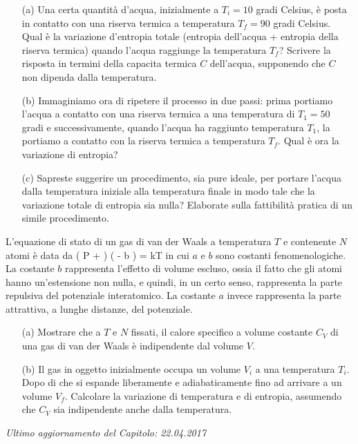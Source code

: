 
\begin{Exercise}[title={Cara, butta giù la pasta che sto arrivando!}, label={ex:01-pasta}]
\begin{itemize}
\item[(a)]
Una certa quantità d'acqua, inizialmente a $T_i = 10$ gradi Celsius, è posta in contatto con una riserva termica a temperatura $T_f = 90$ gradi Celsius. Qual è la variazione d'entropia totale (entropia dell'acqua + entropia della riserva termica) quando l'acqua raggiunge la temperatura $T_f$? Scrivere la risposta in termini della capacita termica $C$ dell'acqua, supponendo che $C$ non dipenda dalla temperatura.
\item[(b)]
Immaginiamo ora di ripetere il processo in due passi: prima portiamo l'acqua a contatto con una riserva termica a una temperatura di $T_1 = 50$ gradi e successivamente, quando l'acqua ha raggiunto temperatura $T_1$, la portiamo a contatto con la riserva termica a temperatura $T_f$. Qual è ora la variazione di entropia?
\item[(c)]
Sapreste suggerire un procedimento, sia pure ideale, per portare l'acqua dalla temperatura iniziale alla temperatura finale in modo tale che la variazione totale di entropia sia nulla? Elaborate sulla fattibilità pratica di un simile procedimento.
\end{itemize}
\end{Exercise}


\begin{Exercise}[title={Gas di van der Waals}, label={ex:01-vanderWaals}]
L'equazione di stato di un gas di van der Waals a temperatura $T$ e contenente $N$ atomi è data da
\be
\left(
P + 
\right)
\left(
 - b
\right) = kT
\ee
in cui $a$ e $b$ sono costanti fenomenologiche. La costante $b$ rappresenta l'effetto di volume escluso, ossia il fatto che gli atomi hanno un'estensione non nulla, e quindi, in un certo senso, rappresenta la parte repulsiva del potenziale interatomico. La costante $a$ invece rappresenta la parte attrattiva, a lunghe distanze, del potenziale.

\begin{itemize}
\item[(a)] Mostrare che a $T$ e $N$ fissati, il calore specifico a volume costante $C_V$ di una gas di van der Waals è indipendente dal volume $V$.
\item[(b)] Il gas in oggetto inizialmente occupa un volume $V_i$ a una temperatura $T_i$. Dopo di che si espande liberamente e adiabaticamente fino ad arrivare a un volume $V_f$. Calcolare la variazione di temperatura e di entropia, assumendo che $C_V$ sia indipendente anche dalla temperatura.
\end{itemize}
\end{Exercise}

\vskip 0.75cm
\begin{flushright}
{\em Ultimo aggiornamento del Capitolo: 22.04.2017}
\end{flushright}
